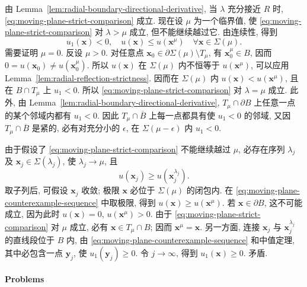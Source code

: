 \begin{Proof}
由 Lemma~\ref{lem:radial-boundary-directional-derivative}, 当 $\lambda$ 充分接近 $R$ 时, \eqref{eq:moving-plane-strict-comparison} 成立. 现在设 $\mu$ 为一个临界值, 使 \eqref{eq:moving-plane-strict-comparison} 对 $\lambda>\mu$ 成立, 但不能继续越过它. 由连续性, 得到
\begin{equation}\label{eq:moving-plane-critical-comparison}
u_1(\bm{x})<0,\quad u(\bm{x})\leq u(\bm{x}^\mu)\quad\forall\bm{x}\in\Sigma(\mu).
\end{equation}
需要证明 $\mu=0$. 反设 $\mu>0$. 对任意点 $\bm{x}_0\in\partial\Sigma(\mu)\setminus T_\mu$, 有 $\bm{x}_0^\mu\in B$, 因而 $0=u(\bm{x}_0)\ne u(\bm{x}_0^\mu)$. 所以 $u(\bm{x})$ 在 $\Sigma(\mu)$ 内不恒等于 $u(\bm{x}^\mu)$, 可以应用 Lemma~\ref{lem:radial-reflection-strictness}. 因而在 $\Sigma(\mu)$ 内 $u(\bm{x})<u(\bm{x}^\mu)$, 且在 $B\cap T_\mu$ 上 $u_1<0$. 所以 \eqref{eq:moving-plane-strict-comparison} 对 $\lambda=\mu$ 成立. 此外, 由 Lemma~\ref{lem:radial-boundary-directional-derivative}, $T_\mu\cap\partial B$ 上任意一点的某个邻域内都有 $u_1<0$. 因此 $T_\mu\cap\overline B$ 上每一点都具有使 $u_1<0$ 的邻域, 又因 $T_\mu\cap\overline B$ 是紧的, 必有对充分小的 $\epsilon$, 在 $\Sigma(\mu-\epsilon)$ 内 $u_1<0$.

由于假设了 \eqref{eq:moving-plane-strict-comparison} 不能继续越过 $\mu$, 必存在序列 $\lambda_j$ 及 $\bm{x}_j\in\Sigma(\lambda_j)$, 使 $\lambda_j\to\mu$, 且
\begin{equation}\label{eq:moving-plane-counterexample-sequence}
u(\bm{x}_j)\geq u(\bm{x}_j^{\lambda_j}).
\end{equation}
取子列后, 可假设 $\bm{x}_j$ 收敛; 极限 $\bm{x}$ 必位于 $\Sigma(\mu)$ 的闭包内. 在 \eqref{eq:moving-plane-counterexample-sequence} 中取极限, 得到 $u(\bm{x})\geq u(\bm{x}^\mu)$. 若 $\bm{x}\in\partial B$, 这不可能成立, 因为此时 $u(\bm{x})=0$, $u(\bm{x}^\mu)>0$. 由于 \eqref{eq:moving-plane-strict-comparison} 对 $\mu$ 成立, 必有 $\bm{x}\in T_\mu\cap B$; 因而 $\bm{x}^\mu=\bm{x}$. 另一方面, 连接 $\bm{x}_j$ 与 $\bm{x}_j^{\lambda_j}$ 的直线段位于 $B$ 内, 由 \eqref{eq:moving-plane-counterexample-sequence} 和中值定理, 其中必包含一点 $\bm{y}_j$, 使 $u_1(\bm{y}_j)\geq0$. 令 $j\to\infty$, 得到 $u_1(\bm{x})\geq0$. 矛盾.
\end{Proof}

\paragraph*{Problems}

